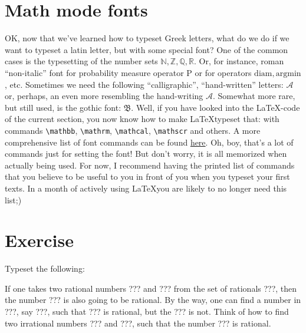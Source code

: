 \section{Math mode fonts}
\par OK, now that we’ve learned how to typeset Greek letters, what do we do if we want to typeset a latin letter, but with some special font? One of the common cases is the typesetting of the number sets \(\mathbb{N}, \mathbb{Z}, \mathbb{Q}, \mathbb{R}\). Or, for instance, roman “non-italic” font for probability measure operator \(\mathrm{P}\) or for operators \(\mathrm{diam}, \mathrm{argmin}\), etc. Sometimes we need the following “calligraphic”, “hand-written” letters: \(\mathcal{A}\) or, perhaps, an even more resembling the hand-writing \(\mathscr{A}\). Somewhat more rare, but still used, is the gothic font: \( \mathfrak{B} \). Well, if you have looked into the \LaTeX-code of the current section, you now know how to make \LaTeX typeset that: with commands \verb"\mathbb", \verb"\mathrm", \verb"\mathcal", \verb"\mathscr" and others. A more comprehensive list of font commands can be found \href{http://tex.stackexchange.com/a/58124}{here}. Oh, boy, that’s a lot of commands just for setting the font! But don’t worry, it is all memorized when actually being used. For now, I recommend having the printed list of commands that you believe to be useful to you in front of you when you typeset your first texts. In a month of actively using \LaTeX you are likely to no longer need this list;)

\section{Exercise}
\begin{staticpart}
Typeset the following:
\end{staticpart}
\par If one takes two rational numbers ??? and ??? from the set of rationals ???, then the number ??? is also going to be rational. By the way, one can find a number in ???, say ???, such that ??? is rational, but the ??? is not. Think of how to find two irrational numbers ??? and ???, such that the number ??? is rational.

